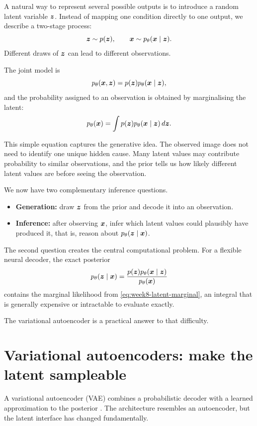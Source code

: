 A natural way to represent several possible outputs is to introduce a random latent variable \(\bm{z}\). Instead of mapping one condition directly to one output, we describe a two-stage process:
\[
  \bm{z} \sim p(\bm{z}),
  \qquad
  \bm{x} \sim p_\theta(\bm{x}\mid\bm{z}).
\]
Different draws of \(\bm{z}\) can lead to different observations.

The joint model is
\[
  p_\theta(\bm{x},\bm{z})
  = p(\bm{z})p_\theta(\bm{x}\mid\bm{z}),
\]
and the probability assigned to an observation is obtained by marginalising the latent:
\begin{equation}
  p_\theta(\bm{x})
  = \int p(\bm{z})p_\theta(\bm{x}\mid\bm{z})\,d\bm{z}.
  \label{eq:week8-latent-marginal}
\end{equation}

This simple equation captures the generative idea. The observed image does not need to identify one unique hidden cause. Many latent values may contribute probability to similar observations, and the prior tells us how likely different latent values are before seeing the observation.

We now have two complementary inference questions.

\begin{itemize}[leftmargin=*]
  \item \textbf{Generation:} draw \(\bm{z}\) from the prior and decode it into an observation.
  \item \textbf{Inference:} after observing \(\bm{x}\), infer which latent values could plausibly have produced it, that is, reason about \(p_\theta(\bm{z}\mid\bm{x})\).
\end{itemize}

The second question creates the central computational problem. For a flexible neural decoder, the exact posterior
\[
  p_\theta(\bm{z}\mid\bm{x})
  = \frac{p(\bm{z})p_\theta(\bm{x}\mid\bm{z})}{p_\theta(\bm{x})}
\]
contains the marginal likelihood from \cref{eq:week8-latent-marginal}, an integral that is generally expensive or intractable to evaluate exactly.

The variational autoencoder is a practical answer to that difficulty.

\section{Variational autoencoders: make the latent sampleable}

A variational autoencoder (VAE) combines a probabilistic decoder with a learned approximation to the posterior \parencite{kingma2014}. The architecture resembles an autoencoder, but the latent interface has changed fundamentally.

